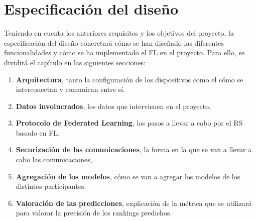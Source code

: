 \section{Especificación del diseño}
Teniendo en cuenta los anteriores requisitos y los objetivos del proyecto, la especificación del diseño concretará cómo se han diseñado las diferentes funcionalidades y cómo se ha implementado el FL en el proyecto. Para ello, se dividirá el capítulo en las siguientes secciones: 

\begin{enumerate}
    \item \textbf{Arquitectura}, tanto la configuración de los dispositivos como el cómo se interconectan y comunican entre sí.  
    \item \textbf{Datos involucrados}, los datos que intervienen en el proyecto. 
    \item \textbf{Protocolo de Federated Learning}, los pasos a llevar a cabo por el RS basado en FL.
    \item \textbf{Securización de las comunicaciones}, la forma en la que se van a llevar a cabo las comunicaciones,
    \item \textbf{Agregación de los modelos}, cómo se van a agregar los modelos de los distintos participantes.
    \item \textbf{Valoración de las predicciones}, explicación de la métrica que se utilizará para valorar la precisión de los rankings predichos.
\end{enumerate}

\newpage

\newpage

\newpage

\newpage

\newpage

\newpage
